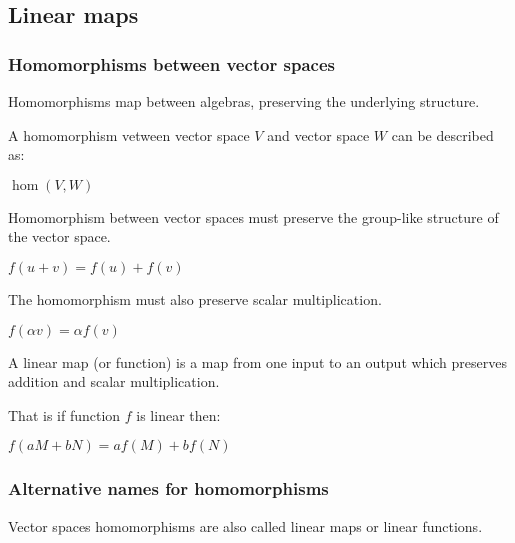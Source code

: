 
\subsection{Linear maps}

\subsubsection{Homomorphisms between vector spaces}

Homomorphisms map between algebras, preserving the underlying structure.

A homomorphism vetween vector space \(V\) and vector space \(W\) can be described as:

\(\hom (V, W)\)

Homomorphism between vector spaces must preserve the group-like structure of the vector space.

\(f(u+v)=f(u)+f(v)\)

The homomorphism must also preserve scalar multiplication.

\(f(\alpha v)=\alpha f(v)\)

A linear map (or function) is a map from one input to an output which preserves addition and scalar multiplication.

That is if function \(f\) is linear then:

\(f(aM+bN)=af(M)+bf(N)\)

\subsubsection{Alternative names for homomorphisms}

Vector spaces homomorphisms are also called linear maps or linear functions.

